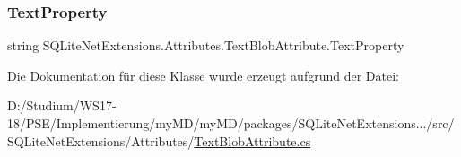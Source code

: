 \mbox{\label{class_s_q_lite_net_extensions_1_1_attributes_1_1_text_blob_attribute_a30bb52fdf2d622ee564d8f1bcab1f3d3}} 
\subsubsection{\texorpdfstring{Text\+Property}{TextProperty}}
{\footnotesize\ttfamily string S\+Q\+Lite\+Net\+Extensions.\+Attributes.\+Text\+Blob\+Attribute.\+Text\+Property\hspace{0.3cm}{\ttfamily [get]}}



Die Dokumentation für diese Klasse wurde erzeugt aufgrund der Datei\+:\begin{DoxyCompactItemize}
\item 
D\+:/\+Studium/\+W\+S17-\/18/\+P\+S\+E/\+Implementierung/my\+M\+D/my\+M\+D/packages/\+S\+Q\+Lite\+Net\+Extensions.../src/\+S\+Q\+Lite\+Net\+Extensions/\+Attributes/\mbox{\hyperlink{_text_blob_attribute_8cs}{Text\+Blob\+Attribute.\+cs}}\end{DoxyCompactItemize}
